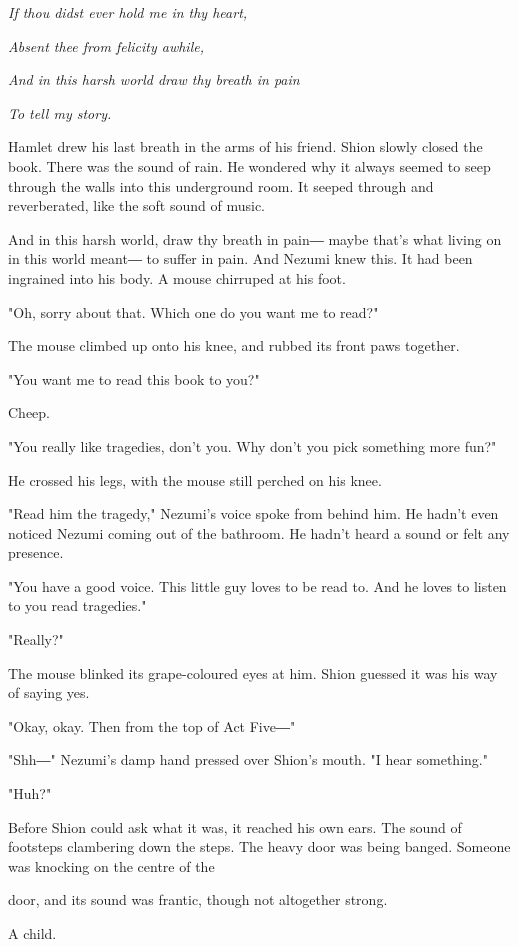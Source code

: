 \emph{If thou didst ever hold me in thy heart,}

\emph{Absent thee from felicity awhile,}

\emph{And in this harsh world draw thy breath in pain}

\emph{To tell my story.}

Hamlet drew his last breath in the arms of his friend. Shion slowly
closed the book. There was the sound of rain. He wondered why it always
seemed to seep through the walls into this underground room. It seeped
through and reverberated, like the soft sound of music.

And in this harsh world, draw thy breath in pain― maybe that's what
living on in this world meant― to suffer in pain. And Nezumi knew this.
It had been ingrained into his body. A mouse chirruped at his foot.

"Oh, sorry about that. Which one do you want me to read?"

The mouse climbed up onto his knee, and rubbed its front paws together.

"You want me to read this book to you?"

Cheep.

"You really like tragedies, don't you. Why don't you pick something more
fun?"

He crossed his legs, with the mouse still perched on his knee.

"Read him the tragedy," Nezumi's voice spoke from behind him. He hadn't
even noticed Nezumi coming out of the bathroom. He hadn't heard a sound
or felt any presence.

"You have a good voice. This little guy loves to be read to. And he
loves to listen to you read tragedies."

"Really?"

The mouse blinked its grape-coloured eyes at him. Shion guessed it was
his way of saying yes.

"Okay, okay. Then from the top of Act Five―"

"Shh―" Nezumi's damp hand pressed over Shion's mouth. "I hear
something."

"Huh?"

Before Shion could ask what it was, it reached his own ears. The sound
of footsteps clambering down the steps. The heavy door was being banged.
Someone was knocking on the centre of the~

door, and its sound was frantic, though not altogether strong.

A child.

